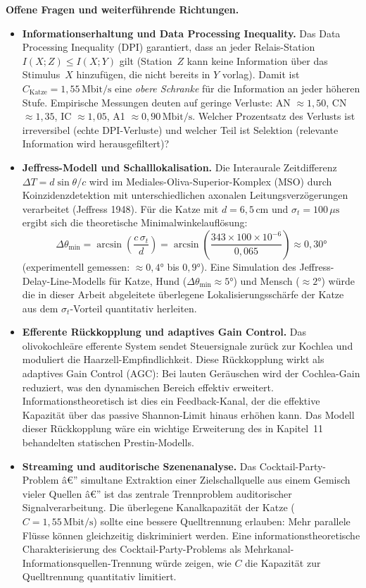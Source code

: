 ﻿\documentclass[12pt,a4paper,titlepage]{report}
\begin{document}
\textbf{Offene Fragen und weiterführende Richtungen.}
\begin{itemize}[leftmargin=2em]
  \item \textbf{Informationserhaltung und Data Processing Inequality.}
    Das Data Processing Inequality (DPI) garantiert,
    dass an jeder Relais-Station
    $I(X;Z) \leq I(X;Y)$ gilt (Station~$Z$ kann keine Information
    über das Stimulus~$X$ hinzufügen, die nicht bereits in $Y$ vorlag).
    Damit ist $C_\mathrm{Katze}=1{,}55\,\mathrm{Mbit/s}$ eine
    \emph{obere Schranke} für die Information an jeder höheren Stufe.
    Empirische Messungen deuten auf geringe Verluste:
    AN $\approx 1{,}50$, CN $\approx 1{,}35$, IC $\approx 1{,}05$,
    A1 $\approx 0{,}90\,\mathrm{Mbit/s}$.
    Welcher Prozentsatz des Verlusts ist irreversibel
    (echte DPI-Verluste) und welcher Teil ist Selektion
    (relevante Information wird herausgefiltert)?
  \item \textbf{Jeffress-Modell und Schalllokalisation.}
    Die Interaurale Zeitdifferenz $\Delta T = d\sin\theta/c$
    wird im Mediales-Oliva-Superior-Komplex (MSO) durch
    Koinzidenzdetektion mit unterschiedlichen axonalen Leitungsverzögerungen
    verarbeitet (Jeffress 1948).
    Für die Katze mit $d=6{,}5\,\mathrm{cm}$ und $\sigma_t=100\,\mu\mathrm{s}$
    ergibt sich die theoretische Minimalwinkelauflösung:
    \[
      \Delta\theta_{\min} = \arcsin\!\left(\frac{c\,\sigma_t}{d}\right)
      = \arcsin\!\left(\frac{343 \times 100\times10^{-6}}{0{,}065}\right)
      \approx 0{,}30 °
    \]
    (experimentell gemessen: $\approx0{,}4 °$ bis $0{,}9 °$).
    Eine Simulation des Jeffress-Delay-Line-Modells für Katze,
    Hund ($\Delta\theta_{\min}\approx5 °$) und Mensch ($\approx2 °$)
    würde die in dieser Arbeit abgeleitete überlegene
    Lokalisierungsschärfe der Katze aus dem $\sigma_t$-Vorteil
    quantitativ herleiten.
  \item \textbf{Efferente Rückkopplung und adaptives Gain Control.}
    Das olivokochleäre efferente System sendet Steuersignale
    zurück zur Kochlea und moduliert die Haarzell-Empfindlichkeit.
    Diese Rückkopplung wirkt als adaptives Gain Control (AGC):
    Bei lauten Geräuschen wird der Cochlea-Gain reduziert,
    was den dynamischen Bereich effektiv erweitert.
    Informationstheoretisch ist dies ein Feedback-Kanal,
    der die effektive Kapazität über das passive Shannon-Limit
    hinaus erhöhen kann.
    Das Modell dieser Rückkopplung wäre ein wichtige Erweiterung
    des in Kapitel~11 behandelten statischen Prestin-Modells.
  \item \textbf{Streaming und auditorische Szenenanalyse.}
    Das Cocktail-Party-Problem â€” simultane Extraktion einer
    Zielschallquelle aus einem Gemisch vieler Quellen â€”
    ist das zentrale Trennproblem auditorischer Signalverarbeitung.
    Die überlegene Kanalkapazität der Katze ($C = 1{,}55\,\mathrm{Mbit/s}$)
    sollte eine bessere Quelltrennung erlauben:
    Mehr parallele Flüsse können gleichzeitig diskriminiert werden.
    Eine informationstheoretische Charakterisierung
    des Cocktail-Party-Problems als Mehrkanal-Informationsquellen-Trennung
    würde zeigen, wie $C$ die Kapazität zur Quelltrennung
    quantitativ limitiert.
\end{itemize}
\end{document}
